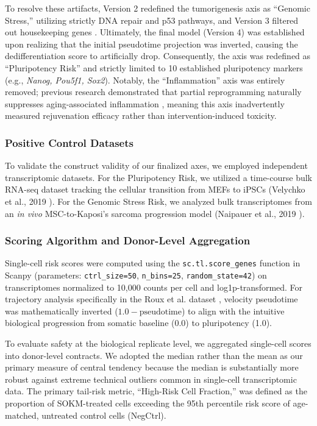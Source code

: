 \documentclass[10pt,twocolumn]{article}
\newcommand{\SOKM}{SOKM}
\begin{document}
To resolve these artifacts, Version 2 redefined the tumorigenesis axis as ``Genomic Stress,'' utilizing strictly DNA repair and p53 pathways, and Version 3 filtered out housekeeping genes \citep{hounkpe2021}. Ultimately, the final model (Version 4) was established upon realizing that the initial pseudotime projection was inverted, causing the dedifferentiation score to artificially drop. Consequently, the axis was redefined as ``Pluripotency Risk'' and strictly limited to 10 established pluripotency markers (e.g., \textit{Nanog, Pou5f1, Sox2}). Notably, the ``Inflammation'' axis was entirely removed; previous research demonstrated that partial reprogramming naturally suppresses aging-associated inflammation \citep{roux2022}, meaning this axis inadvertently measured rejuvenation efficacy rather than intervention-induced toxicity.

\subsubsection{Positive Control Datasets}
To validate the construct validity of our finalized axes, we employed independent transcriptomic datasets. For the Pluripotency Risk, we utilized a time-course bulk RNA-seq dataset tracking the cellular transition from MEFs to iPSCs (Velychko et al., 2019 \citep{velychko2019}). For the Genomic Stress Risk, we analyzed bulk transcriptomes from an \textit{in vivo} MSC-to-Kaposi's sarcoma progression model (Naipauer et al., 2019 \citep{naipauer2019}). 

\subsubsection{Scoring Algorithm and Donor-Level Aggregation}
Single-cell risk scores were computed using the \texttt{sc.tl.score\_genes} function in Scanpy (parameters: \texttt{ctrl\_size=50}, \texttt{n\_bins=25}, \texttt{random\_state=42}) on transcriptomes normalized to 10{,}000 counts per cell and log1p-transformed. For trajectory analysis specifically in the Roux et al. dataset \citep{roux2022}, velocity pseudotime was mathematically inverted ($1.0 - \text{pseudotime}$) to align with the intuitive biological progression from somatic baseline (0.0) to pluripotency (1.0). 

To evaluate safety at the biological replicate level, we aggregated single-cell scores into donor-level contracts. We adopted the median rather than the mean as our primary measure of central tendency because the median is substantially more robust against extreme technical outliers common in single-cell transcriptomic data. The primary tail-risk metric, ``High-Risk Cell Fraction,'' was defined as the proportion of \SOKM-treated cells exceeding the 95th percentile risk score of age-matched, untreated control cells (NegCtrl).
\end{document}
